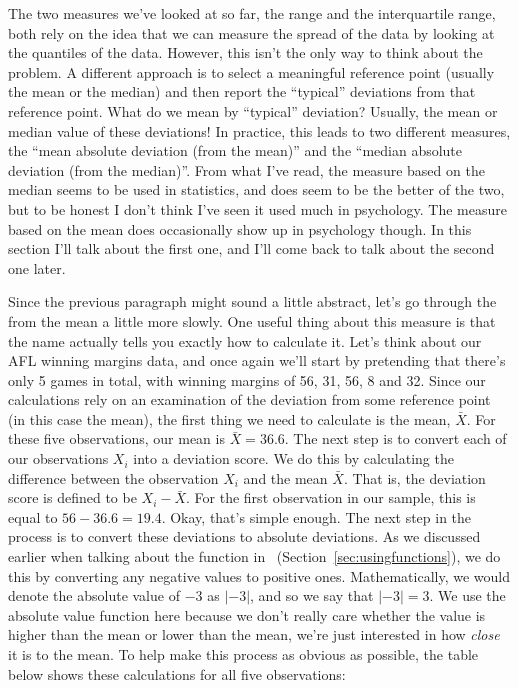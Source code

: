 The two measures we've looked at so far, the range and the interquartile range, both rely on the idea that we can measure the spread of the data by looking at the quantiles of the data. However, this isn't the only way to think about the problem. A different approach is to select a meaningful reference point (usually the mean or the median) and then report the ``typical'' deviations from that reference point. What do we mean by ``typical'' deviation? Usually, the mean or median value of these deviations! In practice, this leads to two different measures, the ``mean absolute deviation (from the mean)'' and the ``median absolute deviation (from the median)''. From what I've read, the measure based on the median seems to be used in statistics, and does seem to be the better of the two, but to be honest I don't think I've seen it used much in psychology. The measure based on the mean does occasionally show up in psychology though. In this section I'll talk about the first one, and I'll come back to talk about the second one later.

Since the previous paragraph might sound a little abstract, let's go through the  from the mean a little more slowly. One useful thing about this measure is that the name actually tells you exactly how to calculate it. Let's think about our AFL winning margins data, and once again we'll start by pretending that there's only 5 games in total, with winning margins of 56, 31, 56, 8 and 32. Since our calculations rely on an examination of the deviation from some reference point (in this case the mean), the first thing we need to calculate is the mean, $\bar{X}$. For these five observations, our mean is $\bar{X} = 36.6$. The next step is to convert each of our observations $X_i$ into a deviation score. We do this by calculating the difference between the observation $X_i$ and the mean $\bar{X}$. That is, the deviation score is defined to be $X_i - \bar{X}$. For the first observation in our sample, this is equal to $56 - 36.6 = 19.4$. Okay, that's simple enough. The next step in the process is to convert these deviations to absolute deviations. As we discussed earlier when talking about  the  function in \R\ (Section~\ref{sec:usingfunctions}), we do this by converting any negative values to positive ones. Mathematically, we would denote the absolute value of $-3$ as $|-3|$, and so we say that $|-3| = 3$. We use the absolute value function here because we don't really care whether the value is higher than the mean or lower than the mean, we're just interested in how {\it close} it is to the mean. To help make this process as obvious as possible, the table below shows these calculations for all five observations:

